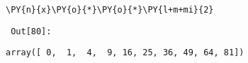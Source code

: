 {\par%
\vspace{-1\baselineskip}%
}%
\begin{notebookcell}[80]%
\begin{addmargin}[\cellleftmargin]{0em}%
{\smaller%
\par%
%
\vspace{-1\smallerfontscale}%
\begin{Verbatim}[commandchars=\\\{\}]
\PY{n}{x}\PY{o}{*}\PY{o}{*}\PY{l+m+mi}{2}
\end{Verbatim}
%
\par%
\vspace{-1\smallerfontscale}}%
\end{addmargin}
\end{notebookcell}

\par\vspace{1\smallerfontscale}%
    
        {\par%
        \vspace{-1\smallerfontscale}%
        \noindent%
        \begin{minipage}{\cellleftmargin}%
    \hfill%
    {\smaller%
    \tt%
    \color{nbframe-out-prompt}%
    Out[80]:}%
    \hspace{\inputpadding}%
    \hspace{0em}%
    \hspace{3pt}%
    \end{minipage}%
        }%
    \begin{addmargin}[\cellleftmargin]{0em}%
    {\smaller%
    \vspace{-1\smallerfontscale}%
    
    
    
    \begin{verbatim}
array([ 0,  1,  4,  9, 16, 25, 36, 49, 64, 81])
    \end{verbatim}

    
}%
    \end{addmargin}%


